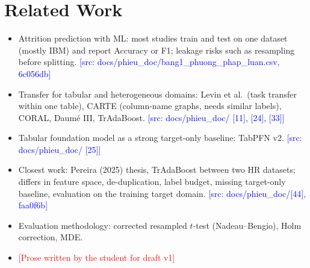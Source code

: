 \documentclass[conference]{IEEEtran}
\newcommand{\todoSV}[1]{\textcolor{red}{[#1]}}
\newcommand{\src}[1]{\textcolor{blue}{\scriptsize[src: #1]}}
\begin{document}
\section{Related Work}  %
\begin{itemize}
  \item Attrition prediction with ML: most studies train and test on one dataset (mostly IBM) and report Accuracy or F1; leakage risks such as resampling before splitting. \src{docs/phieu\_doc/bang1\_phuong\_phap\_luan.csv, 6c056db}
  \item Transfer for tabular and heterogeneous domains: Levin et al.\ (task transfer within one table), CARTE (column-name graphs, needs similar labels), CORAL, Daum\'e III, TrAdaBoost. \src{docs/phieu\_doc/ [11], [24], [33]}
  \item Tabular foundation model as a strong target-only baseline: TabPFN v2. \src{docs/phieu\_doc/ [25]}
  \item Closest work: Pereira (2025) thesis, TrAdaBoost between two HR datasets; differs in feature space, de-duplication, label budget, missing target-only baseline, evaluation on the training target domain. \src{docs/phieu\_doc/[44], faa0f6b}
  \item Evaluation methodology: corrected resampled $t$-test (Nadeau--Bengio), Holm correction, MDE.
  \item \todoSV{Prose written by the student for draft v1}
\end{itemize}

\end{document}
